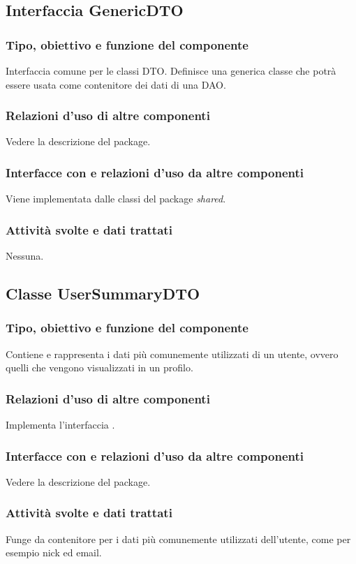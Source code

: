 \subsection{Interfaccia GenericDTO}
\subsubsection*{Tipo, obiettivo e funzione del componente}
Interfaccia comune per le classi DTO. Definisce una generica classe che potr\`a
essere usata come contenitore dei dati di una DAO.
\subsubsection*{Relazioni d'uso di altre componenti}
Vedere la descrizione del package.
\subsubsection*{Interfacce con e relazioni d'uso da altre componenti}
Viene implementata dalle classi del package \emph{shared}.
\subsubsection*{Attivit\`a svolte e dati trattati}
Nessuna. 

\subsection{Classe UserSummaryDTO}
\subsubsection*{Tipo, obiettivo e funzione del componente}
Contiene e rappresenta i dati pi\`u comunemente utilizzati di un utente, ovvero
quelli che vengono visualizzati in un profilo.
\subsubsection*{Relazioni d'uso di altre componenti}
Implementa l'interfaccia .
\subsubsection*{Interfacce con e relazioni d'uso da altre componenti}
Vedere la descrizione del package.
\subsubsection*{Attivit\`a svolte e dati trattati}
Funge da contenitore per i dati pi\`u comunemente utilizzati dell'utente, come
per esempio nick ed email.

